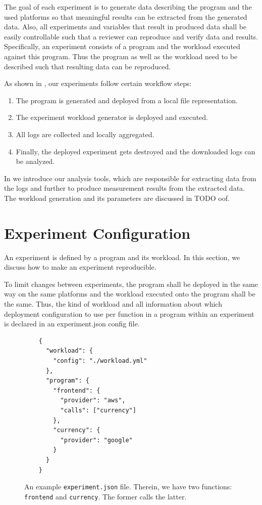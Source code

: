 \documentclass[../main.tex]{subfiles}
\begin{document}
The goal of each experiment is to generate data describing the program and the used platforms 
so that meaningful results can be extracted from the generated data. 
Also, all experiments and variables that result in produced data shall be easily controllable 
such that a reviewer can reproduce and verify data and results.
Specifically, an experiment consists of a program and the workload executed against this program. 
Thus the program as well as the workload need to be described such that resulting data can be reproduced.

As shown in , our experiments follow certain workflow steps: 
\begin{enumerate}
  \item The program is generated and deployed from a local file representation.
  \item The experiment workload generator is deployed and executed.
  \item All logs are collected and locally aggregated.
  \item Finally, the deployed experiment gets destroyed and the downloaded logs can be analyzed.
\end{enumerate}
In  we introduce our analysis tools, which are responsible for 
extracting data from the logs and further to produce measurement results from the extracted data.
The workload generation and its parameters are discussed in TODO oof.

\section{Experiment Configuration}\label{sec:experimentConfig}

An experiment is defined by a program and its workload. 
In this section, we discuss how to make an experiment reproducible. 

To limit changes between experiments, the program shall be deployed in the same way on the same platforms 
and the workload executed onto the program shall be the same. 
Thus, the kind of workload and all information about which deployment configuration 
to use per function in a program within an experiment is declared in an experiment.json config file.

\begin{figure}
  \begin{tcolorbox}
    \begin{verbatim}
    {
      "workload": {
        "config": "./workload.yml"
      },
      "program": {
        "frontend": {
          "provider": "aws",
          "calls": ["currency"]
        },
        "currency": {
          "provider": "google"
        }
      }
    }
    \end{verbatim}
  \end{tcolorbox}
\caption[experiment.json Config Example]{An example \texttt{experiment.json} file. 
Therein, we have two functions: \texttt{frontend} and \texttt{currency}. The former calls the latter.}%
\label{fig:exampleExperimentConfig}
\end{figure}
\end{document}
